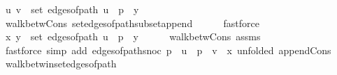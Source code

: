 \begin{isabellebody}
\ {\isachardoublequoteopen}{\isacharbraceleft}{\kern0pt}u{\isacharcomma}{\kern0pt}\ v{\isacharbraceright}{\kern0pt}\ {\isasymin}\ set\ {\isacharparenleft}{\kern0pt}edges{\isacharunderscore}{\kern0pt}of{\isacharunderscore}{\kern0pt}path\ {\isacharparenleft}{\kern0pt}u\ {\isacharhash}{\kern0pt}\ p\ {\isacharat}{\kern0pt}\ {\isacharbrackleft}{\kern0pt}y{\isacharbrackright}{\kern0pt}{\isacharparenright}{\kern0pt}{\isacharparenright}{\kern0pt}{\isachardoublequoteclose}\isanewline
\ \ \ \ \isamarkupfalse%
\ walk{\isacharunderscore}{\kern0pt}betw{\isacharunderscore}{\kern0pt}Cons\ set{\isacharunderscore}{\kern0pt}edges{\isacharunderscore}{\kern0pt}of{\isacharunderscore}{\kern0pt}path{\isacharunderscore}{\kern0pt}subset{\isacharunderscore}{\kern0pt}append\isanewline
\ \ \ \ \isamarkupfalse%
\ fastforce\isanewline
\ \ \isamarkupfalse%
\ {\isachardoublequoteopen}{\isacharbraceleft}{\kern0pt}x{\isacharcomma}{\kern0pt}\ y{\isacharbraceright}{\kern0pt}\ {\isasymin}\ set\ {\isacharparenleft}{\kern0pt}edges{\isacharunderscore}{\kern0pt}of{\isacharunderscore}{\kern0pt}path\ {\isacharparenleft}{\kern0pt}u\ {\isacharhash}{\kern0pt}\ p\ {\isacharat}{\kern0pt}\ {\isacharbrackleft}{\kern0pt}y{\isacharbrackright}{\kern0pt}{\isacharparenright}{\kern0pt}{\isacharparenright}{\kern0pt}{\isachardoublequoteclose}\isanewline
\ \ \ \ \isamarkupfalse%
\ walk{\isacharunderscore}{\kern0pt}betw{\isacharunderscore}{\kern0pt}Cons\ assms{\isacharparenleft}{\kern0pt}{}{\isacharparenright}{\kern0pt}\isanewline
\ \ \ \ \isamarkupfalse%
\ {\isacharparenleft}{\kern0pt}fastforce\ simp\ add{\isacharcolon}{\kern0pt}\ edges{\isacharunderscore}{\kern0pt}of{\isacharunderscore}{\kern0pt}path{\isacharunderscore}{\kern0pt}snoc{\isacharbrackleft}{\kern0pt}\ {\isacharquery}{\kern0pt}p\ {\isacharequal}{\kern0pt}\ {\isachardoublequoteopen}u\ {\isacharhash}{\kern0pt}\ p{\isachardoublequoteclose}\ \ {\isacharquery}{\kern0pt}v\ {\isacharequal}{\kern0pt}\ x{\isacharcomma}{\kern0pt}\ unfolded\ append{\isacharunderscore}{\kern0pt}Cons{\isacharbrackright}{\kern0pt}{\isacharparenright}{\kern0pt}\isanewline
{}\isamarkupfalse%
%
\endisatagproof
{\isafoldproof}%
%
\isadelimproof
\isanewline
%
\endisadelimproof
%
\isadeliminvisible
\isanewline
%
\endisadeliminvisible
%
\isataginvisible
{}\isamarkupfalse%
\ walk{\isacharunderscore}{\kern0pt}betw{\isacharunderscore}{\kern0pt}in{\isacharunderscore}{\kern0pt}set{\isacharunderscore}{\kern0pt}edges{\isacharunderscore}{\kern0pt}of{\isacharunderscore}{\kern0pt}path{\isacharcolon}{\kern0pt}\isanewline

\end{isabellebody}
